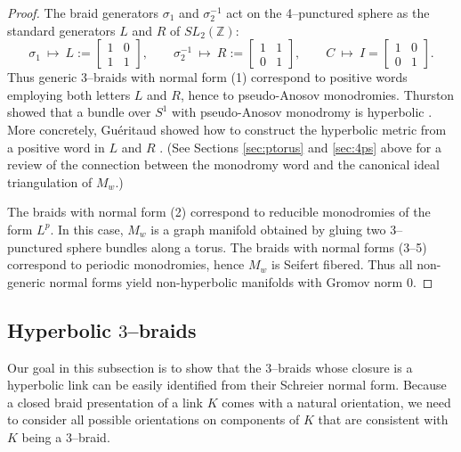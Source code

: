 \documentclass[11pt]{amsart}
\newcommand{\ZZ}{{\mathbb{Z}}}
\theoremstyle{plain}
\theoremstyle{definition}
\begin{document}
\begin{proof}
The braid generators $\sigma_1$ and $\sigma_2^{-1}$ act on the
4--punctured sphere as the standard generators $L$ and $R$ of
$SL_2(\ZZ)$:
$$\sigma_1 \: \mapsto \: L :=
\begin{bmatrix} 1 & 0 \\ 1 & 1 \end{bmatrix}, \qquad
\sigma_2^{-1} \: \mapsto \: R :=
\begin{bmatrix} 1 & 1 \\ 0 & 1 \end{bmatrix}, \qquad
C \: \mapsto \: I =
\begin{bmatrix} 1 & 0 \\ 0 & 1 \end{bmatrix}.$$
%
Thus generic 3--braids with normal form (1) correspond to positive
words employing both letters $L$ and $R$, hence to pseudo-Anosov
monodromies. Thurston showed that a bundle over $S^1$ with
pseudo-Anosov monodromy is hyperbolic \cite{thurston:hypII}.  More
concretely, Gu\'eritaud showed how to construct the hyperbolic metric
from a positive word in $L$ and $R$ \cite{gf:two-bridge}.  (See
Sections \ref{sec:ptorus} and \ref{sec:4ps} above for a review of the
connection between the monodromy word and the canonical ideal
triangulation of $M_w$.)

The braids with normal form (2) correspond to reducible monodromies of
the form $L^p$.  In this case, $M_w$ is a graph manifold obtained by
gluing two 3--punctured sphere bundles along a torus.  The braids with
normal forms (3--5) correspond to periodic monodromies, hence $M_w$ is
Seifert fibered.  Thus all non-generic normal forms yield
non-hyperbolic manifolds with Gromov norm 0.
\end{proof}
 
\subsection{Hyperbolic $3$--braids}
Our goal in this subsection is to show that the $3$--braids whose closure is a hyperbolic link can be easily identified from their Schreier normal form.  
Because a closed braid presentation of a link $K$ comes with a natural orientation, we need to consider all possible orientations on components of $K$ that are consistent with $K$ being a 3--braid. 
\end{document}
